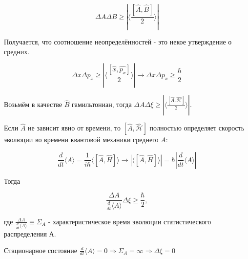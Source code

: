 	$$\Delta A \Delta B \geqslant | \langle \frac{[\hat{A},\hat{B}]}{2} \rangle |$$
	
	Получается, что соотношение неопределённостей - это некое утверждение о средних.
	
	$$\Delta x \Delta p_x \geqslant | \langle \frac{[\hat{x},\hat{p_x}]}{2} \rangle | \rightarrow \Delta x \Delta p_x \geqslant \frac{\hbar}{2}$$
	
	Возьмём в качестве $\hat{B}$ гамильтониан, тогда $\Delta A \Delta \xi \geqslant | \langle \frac{[\hat{A},\hat{\mathcal{H}}]}{2} \rangle |$.
	
	Если $\hat{A}$ не зависит явно от времени, то $[\hat{A},\hat{\mathcal{H}}]$ полностью определяет скорость эволюции во времени квантовой механики среднего $A$: 
	
	$$\frac{d}{dt} \langle A \rangle = \frac{1}{i \hbar} \langle [\hat{A},\hat{H}] \rangle \rightarrow | \langle [\hat{A},\hat{H}] \rangle | = \hbar | \frac{d}{dt} \langle A \rangle |$$
	
	Тогда 
	
	$$\frac{\Delta A}{\frac{d}{dt}\langle A \rangle} \Delta \xi \geqslant \frac{\hbar}{2},$$
	
	где $\frac{\Delta A}{\frac{d}{dt}\langle A \rangle} \equiv \Sigma_A$ - характеристическое время эволюции статистического распределения А.
	
	Стационарное состояние $\frac{d}{dt} \langle A \rangle = 0 \Rightarrow \Sigma_A = \infty \Rightarrow \Delta \xi = 0$
